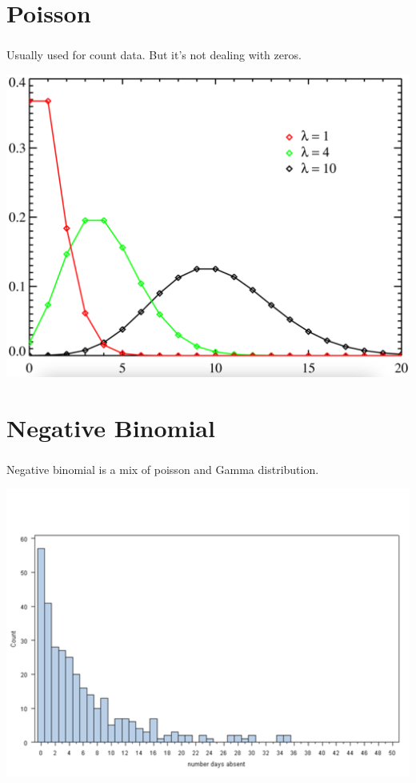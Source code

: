 \documentclass[t, 11pt]{beamer}
\begin{document}
	\section{Poisson}
\begin{frame} 
	\frametitle{\insertsection} 
 Usually used for count data. But it's not dealing with zeros. 
	
	\begin{center}
		\includegraphics[scale=0.23]{pois}
	\end{center}
	
\end{frame}	

	\section{Negative Binomial}
\begin{frame} 
	\frametitle{\insertsection} 
	Negative binomial is a mix of poisson and Gamma distribution. 
	
	\begin{center}
		\includegraphics[scale=0.5]{neg_bin}
	\end{center}
	
\end{frame}	
\end{document}
